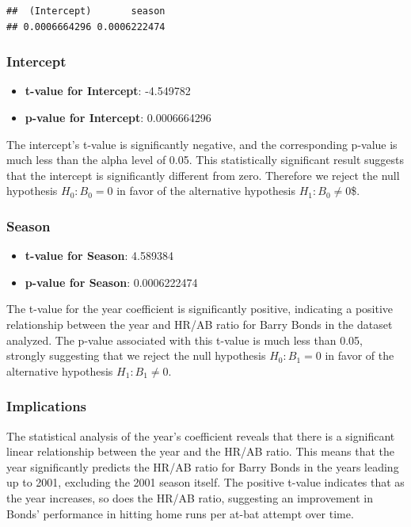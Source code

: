 \documentclass[
]{article}
\providecommand{\tightlist}{%
  \setlength{\itemsep}{0pt}\setlength{\parskip}{0pt}}
\begin{document}
\begin{verbatim}
##  (Intercept)       season 
## 0.0006664296 0.0006222474
\end{verbatim}

\hypertarget{intercept}{%
\subsubsection{Intercept}\label{intercept}}

\begin{itemize}
\tightlist
\item
  \textbf{t-value for Intercept}: -4.549782
\item
  \textbf{p-value for Intercept}: 0.0006664296
\end{itemize}

The intercept's t-value is significantly negative, and the corresponding
p-value is much less than the alpha level of 0.05. This statistically
significant result suggests that the intercept is significantly
different from zero. Therefore we reject the null hypothesis
\(H_0: B_{0} = 0\) in favor of the alternative hypothesis
\(H_1: B_{0} \neq 0\)\$.

\hypertarget{season}{%
\subsubsection{Season}\label{season}}

\begin{itemize}
\tightlist
\item
  \textbf{t-value for Season}: 4.589384
\item
  \textbf{p-value for Season}: 0.0006222474
\end{itemize}

The t-value for the year coefficient is significantly positive,
indicating a positive relationship between the year and HR/AB ratio for
Barry Bonds in the dataset analyzed. The p-value associated with this
t-value is much less than 0.05, strongly suggesting that we reject the
null hypothesis \(H_0: B_{1} = 0\) in favor of the alternative
hypothesis \(H_1: B_{1} \neq 0\).

\hypertarget{implications}{%
\subsubsection{Implications}\label{implications}}

The statistical analysis of the year's coefficient reveals that there is
a significant linear relationship between the year and the HR/AB ratio.
This means that the year significantly predicts the HR/AB ratio for
Barry Bonds in the years leading up to 2001, excluding the 2001 season
itself. The positive t-value indicates that as the year increases, so
does the HR/AB ratio, suggesting an improvement in Bonds' performance in
hitting home runs per at-bat attempt over time.
\end{document}

